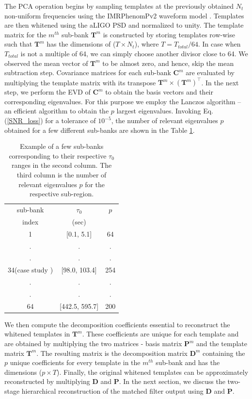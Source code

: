 The PCA operation begins by sampling templates at the previously obtained $N_t$ non-uniform frequencies using the IMRPhenomPv2 waveform model \cite{Phenom}. Templates are then whitened using the aLIGO PSD and normalized to unity. The template matrix for the $m^{th}$ sub-bank $\textbf{T}^m$ is constructed by storing templates row-wise such that $\textbf{T}^m$ has the dimensions of ($T \times N_t$), where $T = T_{total}/64$. In case when $T_{total}$ is not a multiple of 64, we can simply choose another divisor close to 64. We observed the mean vector of $\textbf{T}^m$ to be almost zero, and hence, skip the mean subtraction step. Covariance matrices for each sub-bank $\textbf{C}^m$ are evaluated by multiplying the template matrix with its transpose $\textbf{T}^m \times (\textbf{T}^{m})^{\top}$. In the next step, we perform the EVD of $\textbf{C}^m$ to obtain the basis vectors and their corresponding eigenvalues. For this purpose we employ the Lanczos algorithm \cite{Lanczos} -- an efficient algorithm to obtain the $p$ largest eigenvalues. Invoking Eq. (\ref{SNR_loss}) for a tolerance of $10^{-5}$,  the number of relevant eigenvalues $p$ obtained for a few different sub-banks are shown in the Table \ref{table:sub-banks}.

\begin{table}[H]
    \begin{center}
    \begin{tabular}{|c|c|c|}
    \hline
     sub-bank & $\tau_0$ &$p$\\
     index &  (sec) & \\ 
     \hline
     1 & [0.1, 5.1] & 64 \\
     \hline
     . & . & . \\
     . & . & . \\
     \hline
    34(case study ) & [98.0, 103.4] & 254\\
     \hline
     . & . & . \\
     . & . & . \\
     \hline
     64 & [442.5, 595.7] & 200\\
     \hline
    \end{tabular}
    \end{center}
    \caption{Example of a few sub-banks corresponding to their respective $\tau_0$ ranges in the second column. The third column is the number of relevant eigenvalues $p$ for the respective sub-region.}
    \label{table:sub-banks}
\end{table}


We then compute the decomposition coefficients essential to reconstruct the whitened templates in $\textbf{T}^m$. These coefficients are unique for each template and are obtained by multiplying the two matrices - basis matrix $\textbf{P}^m$ and the template matrix $\textbf{T}^m$. The resulting matrix is the decomposition matrix $\textbf{D}^m$ containing the $p$ unique coefficients for every template in the $m^{th}$ sub-bank and has the dimensions (${p \times T}$). Finally, the original whitened templates can be approximately reconstructed by multiplying $\textbf{D}$ and $\textbf{P}$. In the next section, we discuss the two-stage hierarchical reconstruction of the matched filter output using $\textbf{D}$ and $\textbf{P}$.

